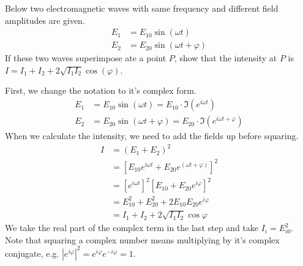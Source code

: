 \documentclass[answers, addpoints]{exam} %
\renewcommand{\phi}{\varphi}
\begin{document}
\begin{questions}

\question[10] Below two electromagnetic waves with same frequency and different field amplitudes are given.
\begin{align*}
	E_1 &= E_{10}\sin(\omega t) \\
	E_2 &= E_{20}\sin(\omega t + \phi)
\end{align*}
If these two waves superimpose ate a point $P$, show that the intensity at $P$ is $I = I_1 + I_2 + 2\sqrt{I_1I_2}\cos(\phi)$.
\begin{solution}
	First, we change the notation to it's complex form.
	\begin{align*}
		E_1 &= E_{10}\sin(\omega t)= E_{10}\cdot\Im{\left(e^{i\omega t}\right)} \\
		E_2 &= E_{20}\sin(\omega t + \phi) =E_{20}\cdot\Im{\left(e^{i\omega t + \phi}\right)}
	\end{align*}
	When we calculate the intensity, we need to add the fields up before squaring.
	\begin{align*}
		I &= (E_1+E_2)^2 \\
		&= \left[E_{10}e^{i\omega t} + E_{20}e^{(\omega t +\phi)}\right]^2 \\
		&= \left[e^{i\omega t}\right]^2 \left[E_{10}+E_{20}e^{i\phi}\right]^2 \\
		&= E_{10}^2+E_{20}^2+2E_{10}E_{20}e^{i\phi} \\
		&= I_1+I_2+2\sqrt{I_1I_2}\cos\phi
	\end{align*}
	We take the real part of the complex term in the last step and take $I_{i} = E_{i0}^2$.
	Note that squaring a complex number means multiplying by it's complex conjugate, e.g. $\left|e^{i\phi}\right|^2 = e^{i\phi}e^{-i\phi} = 1$.
\end{solution}


\end{questions}
\end{document}
